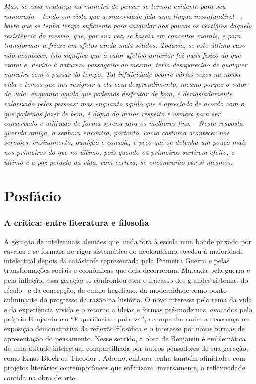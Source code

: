\emph{Mas, se essa mudança na maneira de pensar se tornou evidente para
seu namorado -- tendo em vista que a sinceridade fala uma língua
inconfundível --, basta que se tenha tempo suficiente para aniquilar aos
poucos os vestígios daquela resistência do mesmo, que, por sua vez, se
baseia em conceitos morais, e para transformar a frieza em afetos ainda
mais sólidos. Todavia, se este último caso não acontecer, isto significa
que o calor afetivo anterior foi mais físico do que moral e, devido à
natureza passageira do mesmo, teria desaparecido de qualquer maneira com
o passar do tempo. Tal infelicidade ocorre várias vezes na nossa vida e
temos que nos resignar a ela com desprendimento, mesmo porque o valor da
vida, enquanto aquilo que podemos desfrutar de bom, é demasiadamente
valorizado pelas pessoas; mas enquanto aquilo que é apreciado de acordo
com o que podemos fazer de bem, é digno do maior respeito e esmero para
ser conservado e utilizado de forma serena para os melhores fins. --
Nesta resposta, querida amiga, a senhora encontra, portanto, como
costuma acontecer nos sermões, ensinamento, punição e consolo, e peço
que se detenha um pouco mais nos primeiros do que no último, pois quando
os primeiros surtirem efeito, o último e a paz perdida da vida, com
certeza, se encontrarão por si mesmos.}

\part{Posfácio}


\section{A crítica: entre literatura e filosofia}

A geração de intelectuais alemães que ainda fora à escola num bonde
puxado por cavalos e se formara no rigor sistemático do neokantismo,
acedeu à maioridade intelectual depois da catástrofe representada pela
Primeira Guerra e pelas transformações sociais e econômicas que dela
decorreram. Marcada pela guerra e pela inflação, essa geração se
confrontou com o fracasso dos grandes sistemas do século~ e da
concepção, de cunho hegeliano, da modernidade como ponto culminante do
progresso da razão na história. O novo interesse pelo tema da vida e da
experiência vivida e o retorno a ideias e formas pré-modernas, evocados
pelo próprio Benjamin em ``Experiência e pobreza'', acompanha assim a
descrença na exposição demonstrativa da reflexão filosófica e o
interesse por novas formas de apresentação do pensamento. Nesse sentido,
a obra de Benjamin é emblemática de uma atitude intelectual
compartilhada por outros pensadores de sua geração, como Ernst Bloch ou
Theodor . Adorno, embora tenha também afinidades com projetos
literários contemporâneos que enfatizam, inversamente, a reflexividade
contida na obra de arte.

